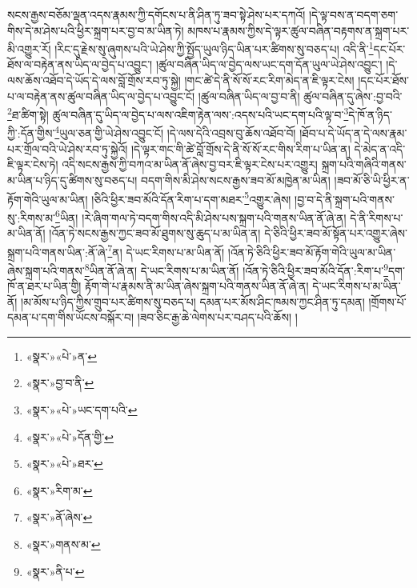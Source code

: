 སངས་རྒྱས་བཅོམ་ལྡན་འདས་རྣམས་ཀྱི་དགོངས་པ་ནི་ཤིན་ཏུ་ཟབ་སྟེ་ཤེས་པར་དཀའོ། །དེ་ལྟ་བས་ན་བདག་ཅག་གིས་དེ་མ་ཤེས་པའི་ཕྱིར་སྐྲག་པར་བྱ་བ་མ་ཡིན་ཏེ། མཁས་པ་རྣམས་ཀྱིས་དེ་ལྟར་ཚུལ་བཞིན་བརྟགས་ན་སྐྲག་པར་མི་འགྱུར་རོ། །རིང་དུ་རྗེས་སུ་ཞུགས་པའི་ཡེ་ཤེས་ཀྱི་སྤྱོད་ཡུལ་ཉིད་ཡིན་པར་ཚིགས་སུ་བཅད་པ། འདི་ནི་\footnote{«སྣར་»«པེ་»ན་}དང་པོར་ཐོས་ལ་བརྟེན་ནས་ཡིད་ལ་བྱེད་པ་འབྱུང་། །ཚུལ་བཞིན་ཡིད་ལ་བྱེད་ལས་ཡང་དག་དོན་ཡུལ་ཡེ་ཤེས་འབྱུང་། །དེ་ལས་ཆོས་འཐོབ་དེ་ཡོད་དེ་ལས་བློ་གྲོས་རབ་ཏུ་སྐྱེ། །གང་ཚེ་དེ་ནི་སོ་སོ་རང་རིག་མེད་ན་ཇི་ལྟར་ངེས། །དང་པོར་ཐོས་པ་ལ་བརྟེན་ནས་ཚུལ་བཞིན་ཡིད་ལ་བྱེད་པ་འབྱུང་ངོ། །ཚུལ་བཞིན་ཡིད་ལ་བྱ་བ་ནི། ཚུལ་བཞིན་དུ་ཞེས་:བྱ་བའི་\footnote{«སྣར་»བྱ་བ་ནི་}ཐ་ཚིག་སྟེ། ཚུལ་བཞིན་དུ་ཡིད་ལ་བྱེད་པ་ལས་འཇིག་རྟེན་ལས་:འདས་པའི་ཡང་དག་པའི་ལྟ་བ་\footnote{«སྣར་»«པེ་»ཡང་དག་པའི་}དེ་ཁོ་ན་ཉིད་ཀྱི་:དོན་གྱིས་\footnote{«སྣར་»«པེ་»དོན་གྱི་}ཡུལ་ཅན་གྱི་ཡེ་ཤེས་འབྱུང་ངོ། །དེ་ལས་དེའི་འབྲས་བུ་ཆོས་འཐོབ་བོ། །ཐོབ་པ་དེ་ཡོད་ན་དེ་ལས་རྣམ་པར་གྲོལ་བའི་ཡེ་ཤེས་རབ་ཏུ་སྐྱེའོ། །དེ་ལྟར་གང་གི་ཚེ་བློ་གྲོས་དེ་ནི་སོ་སོ་རང་གིས་རིག་པ་ཡིན་ན། དེ་མེད་ན་འདི་ཇི་ལྟར་ངེས་ཏེ། འདི་སངས་རྒྱས་ཀྱི་བཀའ་མ་ཡིན་ནོ་ཞེས་བྱ་བར་ཇི་ལྟར་ངེས་པར་འགྱུར། སྐྲག་པའི་གཞིའི་གནས་མ་ཡིན་པ་ཉིད་དུ་ཚིགས་སུ་བཅད་པ། བདག་གིས་མི་ཤེས་སངས་རྒྱས་ཟབ་མོ་མཁྱེན་མ་ཡིན། །ཟབ་མོ་ཅི་ཡི་ཕྱིར་ན་རྟོག་གེའི་ཡུལ་མ་ཡིན། །ཅིའི་ཕྱིར་ཟབ་མོའི་དོན་རིག་པ་དག་མཐར་\footnote{«སྣར་»«པེ་»ཐར་}འགྱུར་ཞེས། །བྱ་བ་དེ་ནི་སྐྲག་པའི་གནས་སུ་:རིགས་མ་\footnote{«སྣར་»རིག་མ་}ཡིན། །རེ་ཞིག་གལ་ཏེ་བདག་གིས་འདི་མི་ཤེས་པས་སྐྲག་པའི་གནས་ཡིན་ནོ་ཞེ་ན། དེ་ནི་རིགས་པ་མ་ཡིན་ནོ། །འོན་ཏེ་སངས་རྒྱས་ཀྱང་ཟབ་མོ་ཐུགས་སུ་ཆུད་པ་མ་ཡིན་ན། དེ་ཅིའི་ཕྱིར་ཟབ་མོ་སྟོན་པར་འགྱུར་ཞེས་སྐྲག་པའི་གནས་ཡིན་:ནོ་ཞེ་\footnote{«སྣར་»ནོ་ཞེས་}ན། དེ་ཡང་རིགས་པ་མ་ཡིན་ནོ། །འོན་ཏེ་ཅིའི་ཕྱིར་ཟབ་མོ་རྟོག་གེའི་ཡུལ་མ་ཡིན་ཞེས་སྐྲག་པའི་གནས་\footnote{«སྣར་»གནས་མ་}ཡིན་ནོ་ཞེ་ན། དེ་ཡང་རིགས་པ་མ་ཡིན་ནོ། །འོན་ཏེ་ཅིའི་ཕྱིར་ཟབ་མོའི་དོན་:རིག་པ་\footnote{«སྣར་»ནི་པ་}དག་ཁོ་ན་ཐར་པ་ཡིན་གྱི། རྟོག་གེ་པ་རྣམས་ནི་མ་ཡིན་ཞེས་སྐྲག་པའི་གནས་ཡིན་ནོ་ཞེ་ན། དེ་ཡང་རིགས་པ་མ་ཡིན་ནོ། །མ་མོས་པ་ཉིད་ཀྱིས་གྲུབ་པར་ཚིགས་སུ་བཅད་པ། དམན་པར་མོས་ཤིང་ཁམས་ཀྱང་ཤིན་ཏུ་དམན། །གྲོགས་པོ་དམན་པ་དག་གིས་ཡོངས་བསྐོར་བ། །ཟབ་ཅིང་རྒྱ་ཆེ་ལེགས་པར་བཤད་པའི་ཆོས། །

